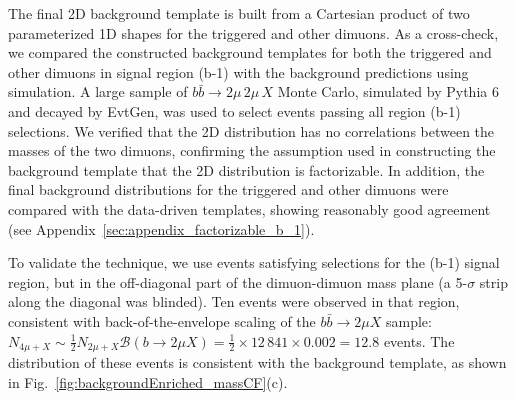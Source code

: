 The final 2D background template is built from a Cartesian product of
two parameterized 1D shapes for the triggered and other dimuons. As a
cross-check, we compared the constructed background templates for both
the triggered and other dimuons in signal region (b-1) with the
background predictions using simulation.  A large sample of $b\bar{b}
\to 2\mu \, 2\mu \, X$ Monte Carlo, simulated by Pythia 6 and decayed
by EvtGen, was used to select events passing all region (b-1)
selections. We verified that the 2D distribution has no correlations
between the masses of the two dimuons, confirming the assumption used
in constructing the background template that the 2D distribution is
factorizable. In addition, the final background distributions for the
triggered and other dimuons were compared with the data-driven
templates, showing reasonably good agreement (see
Appendix~\ref{sec:appendix_factorizable_b_1}).

To validate the technique, we use events satisfying selections for the
(b-1) signal region, but in the off-diagonal part of the dimuon-dimuon
mass plane (a 5-$\sigma$ strip along the diagonal was blinded). Ten
events were observed in that region, consistent with
back-of-the-envelope scaling of the $b\bar{b} \to 2\mu X$ sample:
$N_{4\mu+X} \sim \tfrac{1}{2} N_{2\mu+X} \mathcal{B}(b \to 2\mu
X) = \tfrac{1}{2} \times 12\,841 \times 0.002 = 12.8$ events. The distribution 
of these events is consistent with the background template, as shown in 
Fig.~\ref{fig:backgroundEnriched_massCF}(c).
